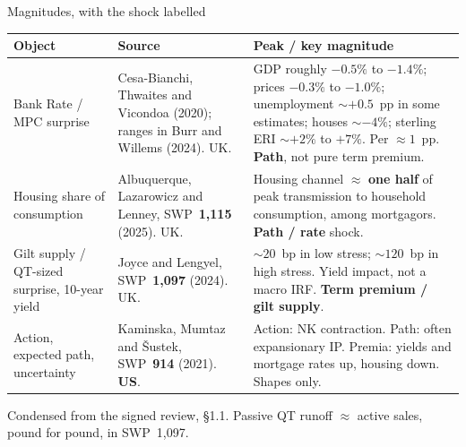 \documentclass[11pt,aspectratio=169]{beamer}
\begin{document}
\begin{frame}{Magnitudes, with the shock labelled}
  {\scriptsize
  \setlength{\tabcolsep}{3.5pt}
  \renewcommand{\arraystretch}{1.12}
  \begin{tabular}{@{}>{\raggedright\arraybackslash}p{2.55cm}>{\raggedright\arraybackslash}p{3.15cm}>{\raggedright\arraybackslash}p{6.35cm}@{}}
    \toprule
    Object & Source & Peak / key magnitude \\
    \midrule
    Bank Rate / MPC surprise
      & Cesa-Bianchi, Thwaites and Vicondoa (2020); ranges in Burr and Willems (2024). UK.
      & GDP roughly $-0.5\%$ to $-1.4\%$; prices $-0.3\%$ to $-1.0\%$; unemployment $\sim +0.5$~pp in some estimates; houses $\sim -4\%$; sterling ERI $\sim +2\%$ to $+7\%$. Per $\approx 1$~pp. \textbf{Path}, not pure term premium. \\
    Housing share of consumption
      & Albuquerque, Lazarowicz and Lenney, SWP~\textbf{1,115} (2025). UK.
      & Housing channel $\approx$ \textbf{one half} of peak transmission to household consumption, among mortgagors. \textbf{Path / rate} shock. \\
    Gilt supply / QT-sized surprise, 10-year yield
      & Joyce and Lengyel, SWP~\textbf{1,097} (2024). UK.
      & $\sim 20$~bp in low stress; $\sim 120$~bp in high stress. Yield impact, not a macro IRF. \textbf{Term premium / gilt supply}. \\
    Action, expected path, uncertainty
      & Kaminska, Mumtaz and \v{S}ustek, SWP~\textbf{914} (2021). \textbf{US}.
      & Action: NK contraction. Path: often expansionary IP. Premia: yields and mortgage rates up, housing down. Shapes only. \\
    \bottomrule
  \end{tabular}
  }
  \vspace{0.25em}
  {\scriptsize Condensed from the signed review, \S1.1.
  Passive QT runoff $\approx$ active sales, pound for pound, in SWP~1,097.}
\end{frame}
\end{document}

